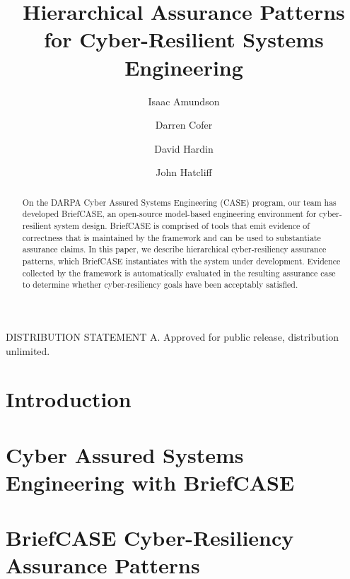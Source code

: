 \documentclass[runningheads]{llncs}
\begin{document}
\title{Hierarchical Assurance Patterns for Cyber-Resilient Systems Engineering}

\author{
	Isaac Amundson 
	\and Darren Cofer 
	\and David Hardin 
	\and John Hatcliff}



\maketitle

\begin{abstract}

On the DARPA Cyber Assured Systems Engineering (CASE) program, our team has developed BriefCASE, an open-source model-based engineering environment for cyber-resilient system design.  BriefCASE is comprised of tools that emit evidence of correctness that is maintained by the framework and can be used to substantiate assurance claims.  
In this paper, we describe hierarchical cyber-resiliency assurance patterns, which BriefCASE instantiates with the system under development. Evidence collected by the framework is automatically evaluated in the resulting assurance case to determine whether cyber-resiliency goals have been acceptably satisfied.

\end{abstract}

DISTRIBUTION STATEMENT A. Approved for public release, distribution unlimited.

\section{Introduction}
\label{sec:introduction}


\section{Cyber Assured Systems Engineering with BriefCASE}
\label{sec:briefcase}


\section{BriefCASE Cyber-Resiliency Assurance Patterns}
\label{sec:assurance-pattern}

\end{document}
